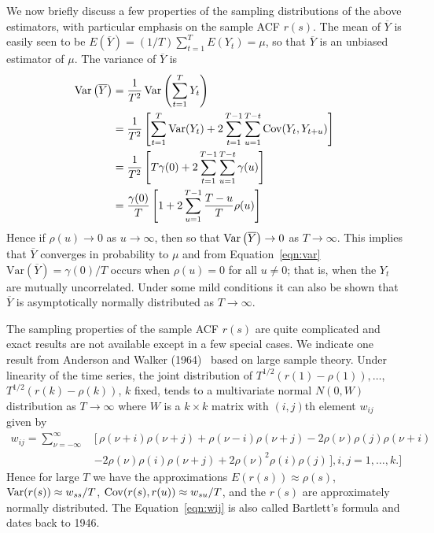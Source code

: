 We now briefly discuss a few properties of the sampling distributions of the above estimators, with particular emphasis on the sample ACF $r(s)$.  The mean of $\overline{Y}$ is easily seen to be $E(\overline{Y})=(1/T)\sum_{t=1}^T E(Y_t) = \mu$, so that $\overline{Y}$ is an unbiased estimator of $\mu$.  The variance of $\overline{Y}$ is
	\begin{equation} \label{eqn:var}
	\begin{split}
        \Var\left(\overline{Y}\right)&= \frac{1}{T^2} \Var\left( \sum_{t=1}^T Y_t\right) \\
                &= \frac{1}{T^2} \left[ \sum_{t=1}^T \text{Var} (Y_t) + 2 \sum_{t=1}^{T-1}\sum_{u=1}^{T-t} \Cov(Y_t, Y_{t+u}) \right] \\
                &= \frac{1}{T^2} \left[ T \gamma(0) + 2 \sum_{t=1}^{T-1}\sum_{u=1}^{T-t} \gamma(u) \right] \\
                 &= \frac{\gamma(0)}{T} \left[1 + 2 \sum_{u=1}^{T-1} \frac{T-u}{T}\rho(u)\right]  
        \end{split}              
        \end{equation}
Hence if $\rho(u) \rightarrow 0$ as $u \rightarrow \infty$, then so that $\operatorname{Var}\left(\overline{Y}\right) \rightarrow 0$ as $T \rightarrow \infty$. This implies that $\overline{Y}$ converges in probability to $\mu$ and from Equation~\ref{eqn:var} $\text{Var}\left(\overline{Y}\right) = \gamma(0)/T$ occurs when $\rho(u)=0$ for all $u \neq 0$; that is, when the $Y_t$ are mutually uncorrelated.  Under some mild conditions it can also be shown that $\overline{Y}$ is asymptotically normally distributed as $T \rightarrow \infty$.


The sampling properties of the sample ACF $r(s)$ are quite complicated and exact results are not available except in a few special cases. We indicate one result from Anderson and Walker (1964)~\cite{anderwalk} based on large sample theory. Under linearity of the time series, the joint distribution of $T^{1/2}(r(1)-\rho(1)),\ldots$,  $T^{1/2}(r(k)-\rho(k))$, $k$ fixed, tends to a multivariate normal $N(0, W)$ distribution as $T \rightarrow \infty$ where $W$ is a $k \times k$ matrix with $(i,j)$th element $w_{ij}$ given by
	\begin{equation} \label{eqn:wij}
	\begin{split}
            w_{ij}= \sum_{\nu= -\infty}^\infty \,& [\, \rho(\nu+i)\rho(\nu+j) + \rho(\nu-i)\rho(\nu+j) - 2 \rho(\nu)\rho(j)\rho(\nu+i)  \\
                     &- 2 \rho(\nu)\rho(i)\rho(\nu+j) + 2 \rho(\nu)^2 \rho(i)\rho(j) \, ],  i, j= 1,\ldots, k. ]
        \end{split}
	\end{equation}
Hence for large $T$ we have the approximations $E(r(s)) \approx \rho(s)$, $\operatorname{Var}(r(s)) \approx w_{ss}/T$, $\operatorname{Cov}(r(s), r(u)) \approx w_{su}/T$, and the $r(s)$ are approximately normally distributed. The Equation~\ref{eqn:wij} is also called Bartlett's formula and dates back to 1946.



